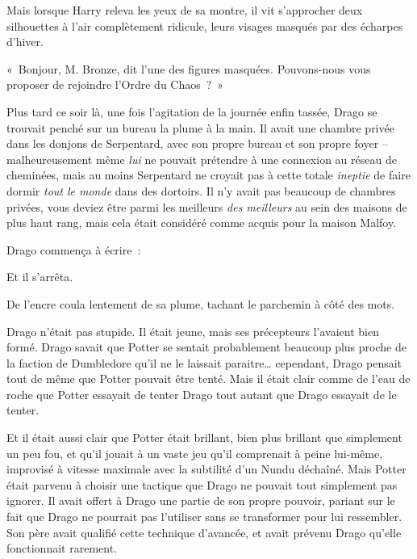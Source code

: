 Mais lorsque Harry releva les yeux de sa montre, il vit s'approcher deux silhouettes à l'air complètement ridicule, leurs visages masqués par des écharpes d'hiver.

«~Bonjour, M. Bronze, dit l'une des figures masquées. Pouvons-nous vous proposer de rejoindre l'Ordre du Chaos~?~»


\aftermaths

Plus tard ce soir là, une fois l'agitation de la journée enfin tassée, Drago se trouvait penché sur un bureau la plume à la main.
Il avait une chambre privée dans les donjons de Serpentard, avec son propre bureau et son propre foyer -- malheureusement même \emph{lui} ne pouvait prétendre à une connexion au réseau de cheminées, mais au moins Serpentard ne croyait pas à cette totale \emph{ineptie} de faire dormir \emph{tout le monde} dans des dortoirs.
Il n'y avait pas beaucoup de chambres privées, vous deviez être parmi les meilleurs \emph{des meilleurs} au sein des maisons de plus haut rang, mais cela était considéré comme acquis pour la maison Malfoy.

Drago commença à écrire~:

\begin{writtenNote}
\end{writtenNote}

Et il s'arrêta.

De l'encre coula lentement de sa plume, tachant le parchemin à côté des mots.

Drago n'était pas stupide.
Il était jeune, mais ses précepteurs l'avaient bien formé.
Drago savait que Potter se sentait probablement beaucoup plus proche de la faction de Dumbledore qu'il ne le laissait paraitre… cependant, Drago pensait tout de même que Potter pouvait être tenté.
Mais il était clair comme de l'eau de roche que Potter essayait de tenter Drago tout autant que Drago essayait de le tenter.

Et il était aussi clair que Potter était brillant, bien plus brillant que simplement un peu fou, et qu'il jouait à un vaste jeu qu'il comprenait à peine lui-même, improvisé à vitesse maximale avec la subtilité d'un Nundu déchaîné.
Mais Potter était parvenu à choisir une tactique que Drago ne pouvait tout simplement pas ignorer.
Il avait offert à Drago une partie de son propre pouvoir, pariant sur le fait que Drago ne pourrait pas l'utiliser sans se transformer pour lui ressembler.
Son père avait qualifié cette technique d'avancée, et avait prévenu Drago qu'elle fonctionnait rarement.

